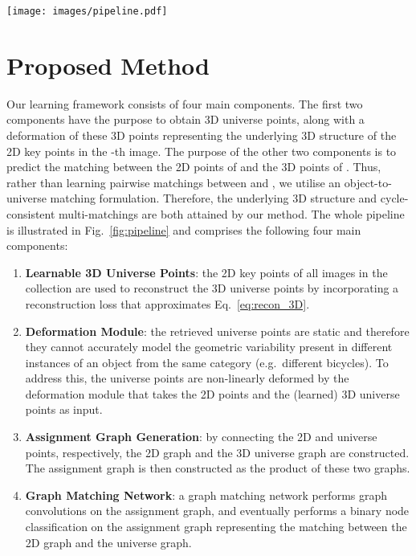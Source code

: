 \begin{figure*}[t!]
    \centering
    \texttt{[image: images/pipeline.pdf]}
    \caption{Overview of our algorithm. Given an image with 2D key points, we infer the corresponding image-specific 3D points in terms of a deformation of 3D universe points. The universe 3D points are learned during training for a given class of objects, while the deformations are predicted per image. We create edges and find a matching between the two graphs using a graph matching network. Since the matchings are between universe points and images, our matchings are intrinsically cycle consistent.}
    \label{fig:pipeline}
\end{figure*}

\section*{Proposed Method}
Our learning framework consists of four main components. The first two components have the purpose to obtain
 3D universe points, along with a deformation of these 3D points representing the underlying 3D structure of the 2D key points in the -th image.
The purpose of the other two components is to predict the matching between the 2D points of  and the 3D points of . 
Thus, rather than learning  pairwise matchings between  and , we utilise an object-to-universe matching formulation. 
Therefore, the underlying 3D structure and cycle-consistent multi-matchings  are both attained by our method. 
The whole pipeline is illustrated in Fig.~\ref{fig:pipeline} and comprises the following four main components: 
\begin{enumerate}
    \item \textbf{Learnable 3D Universe Points}: the 2D key points  of all images in the collection are used to reconstruct the 3D universe points  by incorporating a reconstruction loss that approximates Eq.~\eqref{eq:recon_3D}.
    \item \textbf{Deformation Module}: the retrieved universe points  are static and therefore they cannot accurately model the geometric variability present in
     different instances of an object from the same category (e.g.~different bicycles).
    To address this, the universe points are non-linearly deformed by the
    deformation module that takes the 2D points and the (learned) 3D universe points as input. 

    \item \textbf{Assignment Graph Generation}: by connecting the 2D and universe points, respectively, the 2D graph and the 3D universe graph are constructed.
    The assignment graph is then constructed as the product of these two graphs.
    \item \textbf{Graph Matching Network}: a graph matching network performs graph convolutions on the assignment graph, and eventually performs a binary node classification on the assignment graph representing the matching between the 2D graph and the universe graph.

\end{enumerate}


